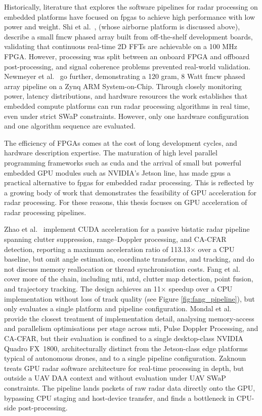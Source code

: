 Historically, literature that explores the software pipelines for radar 
processing on embedded platforms have focused on \gls{fpga}s to achieve
high performance with low power and weight. Shi et al.\ \cite{6712628}, (whose
airborne platform is discussed above), 
describe a small \gls{fmcw} phased array built from off-the-shelf development 
boards, validating that continuous real-time 2D FFTs are achievable on a 100 
MHz FPGA. However, processing was split between an onboard FPGA and offboard 
post-processing, and signal coherence problems prevented real-world validation. %
Newmeyer et al.\ \cite{7577322} go further, demonstrating a 120 gram, 8 Watt 
\gls{fmcw}
phased array pipeline on a Zynq ARM System-on-Chip. Through closely monitoring 
power, latency
distributions, and hardware resources the work establishes that embedded 
compute platforms can run radar processing algorithms in real time, even 
under strict SWaP constraints. However, only one hardware
configuration and one algorithm sequence are evaluated. 

The efficiency of FPGAs comes at the cost of long development cycles, and 
hardware description expertise. The maturation of high level parallel 
programming frameworks such as \gls{cuda} and the arrival of small but 
powerful embedded GPU modules such as NVIDIA's Jetson line, has made 
\gls{gpu}s a practical alternative to \gls{fpga}s for 
embedded radar processing. This is reflected by a growing body of work 
that demonstrates the feasibility of GPU acceleration for radar processing. 
For these reasons, this thesis focuses on GPU acceleration of radar 
processing pipelines. 

Zhao et al.\ \cite{rs15225421} implement CUDA acceleration for a passive
bistatic radar pipeline spanning clutter suppression, range--Doppler
processing, and CA-CFAR detection, reporting a maximum acceleration ratio of
113.13$\times$ over a CPU baseline, but omit angle estimation, coordinate
transforms, and tracking, and do not discuss memory reallocation or thread
synchronisation costs. Fang et al.\
\cite{Fang2024} cover more of the chain, including \gls{mti}, \gls{mtd}, clutter map
detection, point fusion, and trajectory tracking. The design achieves an 11$\times$
speedup over a CPU implementation without loss of track quality (see Figure
\ref{fig:fang_pipeline}), but only evaluates a single platform and pipeline configuration. 
Mondal et al.\ \cite{Mondal2024_gpu_radar} provide the
closest treatment of implementation detail, analysing memory-access and
parallelism optimisations per stage across \gls{mti}, Pulse Doppler Processing,
and CA-CFAR, but their evaluation is confined to a single desktop-class NVIDIA
Quadro FX~1800, architecturally distinct from the Jetson-class edge platforms
typical of autonomous drones, and to a single pipeline configuration. Zaknoun
\cite{zaknoun2024_realtime_gpu_accelerated_radar_processing} treats GPU radar
software architecture for real-time processing in depth, but outside a UAV DAA
context and without evaluation under UAV SWaP constraints. The pipeline lands
packets of raw radar data directly onto the GPU, bypassing CPU staging and 
host-device transfer, and finds a bottleneck in CPU-side post-processing. 

